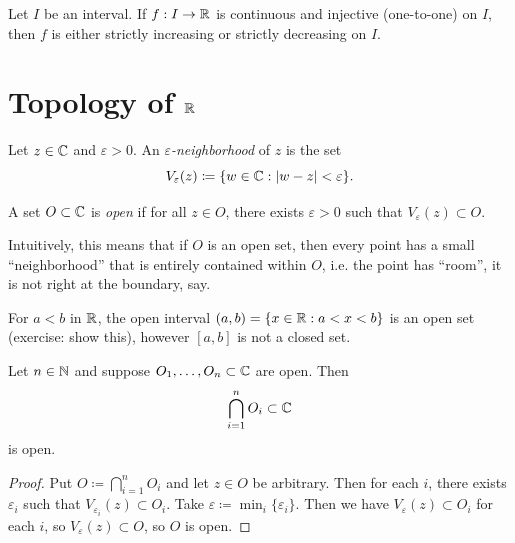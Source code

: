 \documentclass[../analysis1.tex]{subfiles}
\begin{document}
\begin{theorem}
    \begin{shaded*}
        Let $I$ be an interval. If $f: I \to \mathbb{R}$ is continuous and injective (one-to-one) on $I$, then $f$ is either strictly increasing or strictly decreasing on $I$.
    \end{shaded*}
\end{theorem}

\section{Topology of \texorpdfstring{$\mathbb{R}$}{R}}

\begin{definition}
    \begin{shaded*}
        Let $z\in\mathbb{C}$ and $\varepsilon>0$. An \textit{$\varepsilon$-neighborhood} of $z$ is the set
        \[V_\varepsilon(z)\coloneqq\{w\in\mathbb{C}:|w-z|<\varepsilon\}.\]
    \end{shaded*}
\end{definition}

\begin{definition}
    \begin{shaded*}
        A set $O\subset\mathbb{C}$ is \textit{open} if for all $z \in O$, there exists $\varepsilon>0$ such that $V_\varepsilon(z)\subset O$.
    \end{shaded*}
\end{definition}
\begin{remark}
    Intuitively, this means that if $O$ is an open set, then every point has a small ``neighborhood'' that is entirely contained within $O$, i.e. the point has ``room'', it is not right at the boundary, say.
\end{remark}
\begin{example}
    For $a<b$ in $\mathbb{R}$, the open interval $(a,b)=\{x\in\mathbb{R}:a<x<b\}$ is an open set (exercise: show this), however $[a,b]$ is not a closed set.
\end{example}
\begin{lemma}
    \begin{shaded*}
    Let $n\in\mathbb{N}$ and suppose $O_1,\dots,O_n\subset \mathbb{C}$ are open. Then
    \[\bigcap_{i=1}^n O_i\subset\mathbb{C}\]
    is open.
    \end{shaded*}
\end{lemma}
\begin{proof}
    Put $O\coloneqq \bigcap_{i=1}^n O_i$ and let $z\in O$ be arbitrary. Then for each $i$, there exists $\varepsilon_i$ such that $V_{\varepsilon_i}(z)\subset O_i$. Take $\varepsilon\coloneqq\min_i \{\varepsilon_i\}$. Then we have $V_\varepsilon(z)\subset O_i$ for each $i$, so $V_\varepsilon(z)\subset O$, so $O$ is open.\qedhere
\end{proof}
\end{document}
